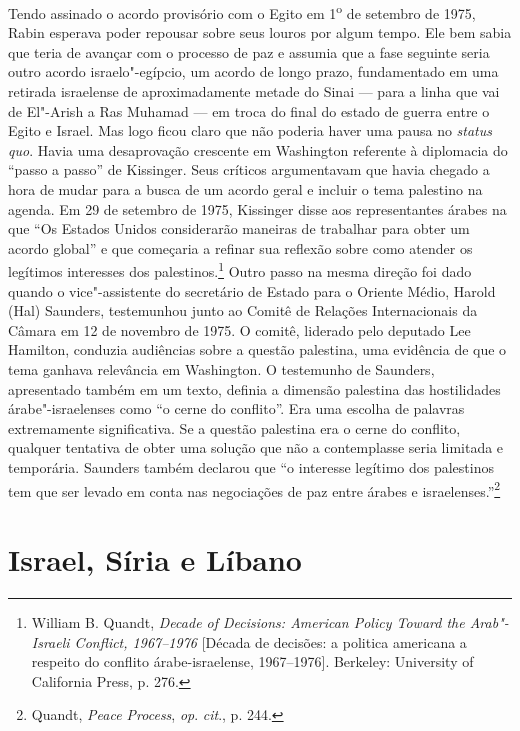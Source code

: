 Tendo assinado o acordo provisório com o Egito em 1\textsuperscript{o}
de setembro de 1975, Rabin esperava poder repousar sobre seus louros por
algum tempo. Ele bem sabia que teria de avançar com o processo de paz
e assumia que a fase seguinte seria outro acordo israelo"-egípcio, um
acordo de longo prazo, fundamentado em uma retirada israelense de
aproximadamente metade do Sinai --- para a linha que vai de El"-Arish a
Ras Muhamad --- em troca do final do estado de guerra entre o Egito e
Israel. Mas logo ficou claro que não poderia haver uma pausa no
\emph{status quo}. Havia uma desaprovação crescente em Washington referente à
diplomacia do ``passo a passo'' de Kissinger. Seus críticos argumentavam
que havia chegado a hora de mudar para a busca de um acordo geral e
incluir o tema palestino na agenda. Em 29 de setembro de 1975, Kissinger
disse aos representantes árabes na  que ``Os Estados Unidos
considerarão maneiras de trabalhar para obter um acordo global'' e que
começaria a refinar sua reflexão sobre como atender os legítimos
interesses dos palestinos.\footnote{William B. Quandt, \emph{Decade of Decisions: American Policy Toward the
Arab"-Israeli Conflict, 1967--1976} {[}Década de decisões: a politica americana a respeito do conflito árabe-israelense, 1967--1976{]}. Berkeley: University of California
Press, p. 276.} Outro passo na mesma direção foi
dado quando o vice"-assistente do secretário de Estado para o Oriente
Médio, Harold (Hal) Saunders, testemunhou junto ao Comitê de Relações
Internacionais da Câmara em 12 de novembro de 1975. O comitê, liderado
pelo deputado Lee Hamilton, conduzia audiências sobre a questão
palestina, uma evidência de que o tema ganhava relevância em Washington.
O testemunho de Saunders, apresentado também em um texto, definia a
dimensão palestina das hostilidades árabe"-israelenses como ``o cerne do
conflito''. Era uma escolha de palavras extremamente significativa. Se a
questão palestina era o cerne do conflito, qualquer tentativa de obter
uma solução que não a contemplasse seria limitada e temporária. Saunders
também declarou que ``o interesse legítimo dos palestinos tem que ser
levado em conta nas negociações de paz entre árabes e
israelenses.''\footnote{Quandt, \emph{Peace Process}, \emph{op}. \emph{cit}., p. 244.}

\section{Israel, Síria e Líbano}

